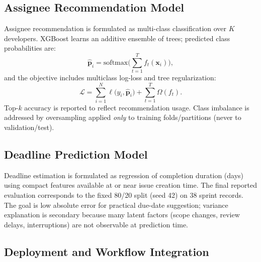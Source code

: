 \documentclass[conference]{IEEEtran}
\begin{document}
\subsection{Assignee Recommendation Model}

Assignee recommendation is formulated as multi-class classification over $K$ developers. XGBoost learns an additive ensemble of trees; predicted class probabilities are:
\begin{equation}
\hat{\mathbf{p}}_i = \mathrm{softmax}\Big(\sum_{t=1}^{T} f_t(\mathbf{x}_i)\Big),
\label{eq:xgb_pred}
\end{equation}
and the objective includes multiclass log-loss and tree regularization:
\begin{equation}
\mathcal{L} = \sum_{i=1}^{N}\ell\big(y_i,\hat{\mathbf{p}}_i\big) + \sum_{t=1}^{T}\Omega(f_t).
\label{eq:xgb_obj}
\end{equation}
Top-$k$ accuracy is reported to reflect recommendation usage. Class imbalance is addressed by oversampling applied \emph{only} to training folds/partitions (never to validation/test).

\subsection{Deadline Prediction Model}

Deadline estimation is formulated as regression of completion duration (days) using compact features available at or near issue creation time. The final reported evaluation corresponds to the fixed 80/20 split (seed 42) on 38 sprint records. The goal is low absolute error for practical due-date suggestion; variance explanation is secondary because many latent factors (scope changes, review delays, interruptions) are not observable at prediction time.

\subsection{Deployment and Workflow Integration}
\end{document}
